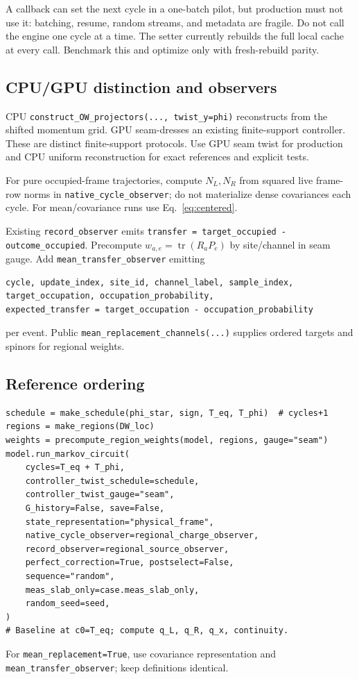 \documentclass[aps,prb,onecolumn,nofootinbib,superscriptaddress]{revtex4-2}
\newcommand{\tr}{\operatorname{tr}}
\newcommand{\code}[1]{\texttt{#1}}
\begin{document}
A callback can set the next cycle in a one-batch pilot, but production must not
use it: batching, resume, random streams, and metadata are fragile.  Do not call
the engine one cycle at a time.  The setter currently rebuilds the full local
cache at every call.  Benchmark this and optimize only with fresh-rebuild
parity.

\subsection{CPU/GPU distinction and observers}

CPU \code{construct\_OW\_projectors(..., twist\_y=phi)} reconstructs from the
shifted momentum grid.  GPU seam-dresses an existing finite-support controller.
These are distinct finite-support protocols.  Use GPU seam twist for production
and CPU uniform reconstruction for exact references and explicit tests.

For pure occupied-frame trajectories, compute $N_L,N_R$ from squared live
frame-row norms in \code{native\_cycle\_observer}; do not materialize dense
covariances each cycle.  For mean/covariance runs use Eq.~\eqref{eq:centered}.

Existing \code{record\_observer} emits
\code{transfer = target\_occupied - outcome\_occupied}.  Precompute
$w_{a,e}=\tr(R_aP_e)$ by site/channel in seam gauge.  Add
\code{mean\_transfer\_observer} emitting
\begin{verbatim}
cycle, update_index, site_id, channel_label, sample_index,
target_occupation, occupation_probability,
expected_transfer = target_occupation - occupation_probability
\end{verbatim}
per event.  Public \code{mean\_replacement\_channels(...)} supplies ordered
targets and spinors for regional weights.

\subsection{Reference ordering}

\begin{verbatim}
schedule = make_schedule(phi_star, sign, T_eq, T_phi)  # cycles+1
regions = make_regions(DW_loc)
weights = precompute_region_weights(model, regions, gauge="seam")
model.run_markov_circuit(
    cycles=T_eq + T_phi,
    controller_twist_schedule=schedule,
    controller_twist_gauge="seam",
    G_history=False, save=False,
    state_representation="physical_frame",
    native_cycle_observer=regional_charge_observer,
    record_observer=regional_source_observer,
    perfect_correction=True, postselect=False,
    sequence="random",
    meas_slab_only=case.meas_slab_only,
    random_seed=seed,
)
# Baseline at c0=T_eq; compute q_L, q_R, q_x, continuity.
\end{verbatim}
For \code{mean\_replacement=True}, use covariance representation and
\code{mean\_transfer\_observer}; keep definitions identical.
\end{document}
